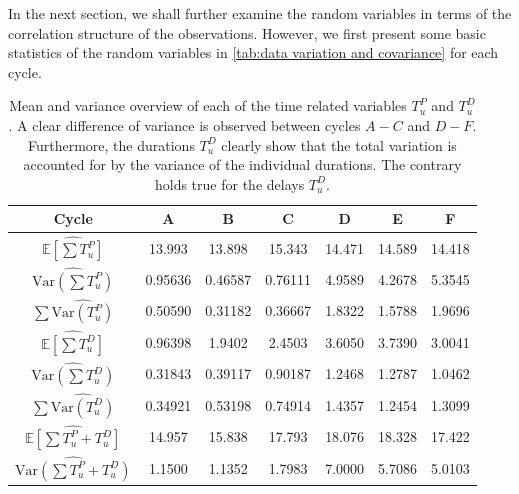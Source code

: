 \documentclass[../Thesis.tex]{subfiles}
\begin{document}
In the next section, we shall further examine the random variables in terms of the correlation structure of the observations. However, we first present some basic statistics of the random variables in \autoref{tab:data variation and covariance} for each cycle.
\begin{table}[ht]
    \centering
    \begin{tabular}{c|cccccc}
        Cycle                                                  & A       & B       & C       & D      & E      & F      \\\hline
        $\widehat{\mathbb{E}\left[\sum T^P_u\right]}$          & 13.993  & 13.898  & 15.343  & 14.471 & 14.589 & 14.418 \\\hline
        $\widehat{\text{Var}\left(\sum T^P_u\right)}$          & 0.95636 & 0.46587 & 0.76111 & 4.9589 & 4.2678 & 5.3545 \\\hline
        $\sum \widehat{\text{Var}\left(T^P_u\right)}$          & 0.50590 & 0.31182 & 0.36667 & 1.8322 & 1.5788 & 1.9696 \\\hline
        $\widehat{\mathbb{E} \left[\sum T^D_u\right]}$         & 0.96398 & 1.9402  & 2.4503  & 3.6050 & 3.7390 & 3.0041 \\\hline
        $\widehat{ \text{Var} \left(\sum T^D_u\right)}$        & 0.31843 & 0.39117 & 0.90187 & 1.2468 & 1.2787 & 1.0462 \\\hline
        $\sum \widehat{\text{Var}\left(T^D_u\right)}$          & 0.34921 & 0.53198 & 0.74914 & 1.4357 & 1.2454 & 1.3099 \\\hline
        $\widehat{\mathbb{E} \left[\sum T^P_u + T^D_u\right]}$ & 14.957  & 15.838  & 17.793  & 18.076 & 18.328 & 17.422 \\\hline
        $\widehat{\text{Var} \left(\sum T^P_u + T^D_u\right)}$ & 1.1500  & 1.1352  & 1.7983  & 7.0000 & 5.7086 & 5.0103
    \end{tabular}
    \caption{Mean and variance overview of each of the time related variables $T^P_u$ and $T^D_u$. A clear difference of variance is observed between cycles $A-C$ and $D-F$. Furthermore, the durations $T^D_u$ clearly show that the total variation is accounted for by the variance of the individual durations. The contrary holds true for the delays $T^D_u$.}
    \label{tab:data variation and covariance}
\end{table}
\end{document}
